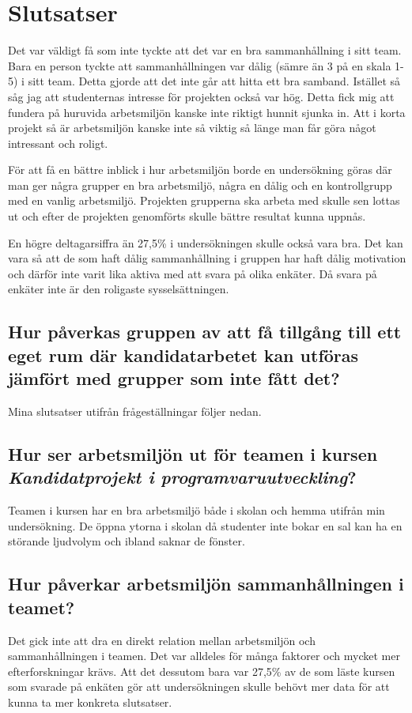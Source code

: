 \section{Slutsatser}
Det var väldigt få som inte tyckte att det var en bra sammanhållning i sitt team. Bara en person tyckte att sammanhållningen var dålig (sämre än 3 på en skala 1-5) i sitt team. Detta gjorde att det inte går att hitta ett bra samband. Istället så såg jag att studenternas intresse för projekten också var hög. Detta fick mig att fundera på huruvida arbetsmiljön kanske inte riktigt hunnit sjunka in. Att i korta projekt så är arbetsmiljön kanske inte så viktig så länge man får göra något intressant och roligt.

För att få en bättre inblick i hur arbetsmiljön borde en undersökning göras där man ger några grupper en bra arbetsmiljö, några en dålig och en kontrollgrupp med en vanlig arbetsmiljö. Projekten grupperna ska arbeta med skulle sen lottas ut och efter de projekten genomförts skulle bättre resultat kunna uppnås. 

En högre deltagarsiffra än 27,5\% i undersökningen skulle också vara bra. Det kan vara så att de som haft dålig sammanhållning i gruppen har haft dålig motivation och därför inte varit lika aktiva med att svara på olika enkäter. Då svara på enkäter inte är den roligaste sysselsättningen.

\subsection{Hur påverkas gruppen av att få tillgång till ett eget rum där kandidatarbetet kan utföras jämfört med grupper som inte fått det?}


\label{sec:conclusions-hampus}
Mina slutsatser utifrån frågeställningar följer nedan.

\subsection{Hur ser arbetsmiljön ut för teamen i kursen \textit{Kandidatprojekt i programvaruutveckling}?}
Teamen i kursen har en bra arbetsmiljö både i skolan och hemma utifrån min undersökning. De öppna ytorna i skolan då studenter inte bokar en sal kan ha en störande ljudvolym och ibland saknar de fönster. 

\subsection{Hur påverkar arbetsmiljön sammanhållningen i teamet?}
Det gick inte att dra en direkt relation mellan arbetsmiljön och sammanhållningen i teamen. Det var alldeles för många faktorer och mycket mer efterforskningar krävs. Att det dessutom bara var 27,5\% av de som läste kursen som svarade på enkäten gör att undersökningen skulle behövt mer data för att kunna ta mer konkreta slutsatser.

